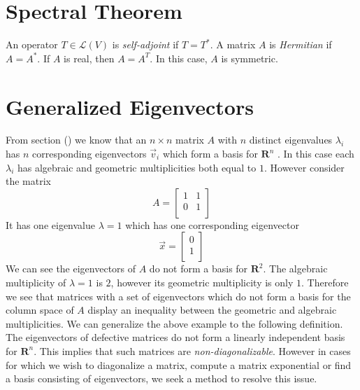 \section{Spectral Theorem}
{An operator $T \in \mathcal{L}(V)$ is \textit{self-adjoint} if $T = T^*$.}
{A matrix $A$ is \textit{Hermitian} if $A = A^*$. 
If $A$ is real, then $A = A^T$. 
In this case, $A$ is symmetric.}


\section{Generalized Eigenvectors}
From section () we know that an $n \times n$ matrix $A$ with $n$ distinct eigenvalues $\lambda_i$ has $n$ corresponding eigenvectors $\vec{v}_i$ which form a basis for $\mathbf{R}^n$ . In this case each $\lambda_i$ has algebraic and geometric multiplicities both equal to $1$. However consider the matrix 
\[A = \begin{bmatrix}
1 & 1 \\
0 & 1 \\
\end{bmatrix} \]
It has one eigenvalue $\lambda = 1$ which has one corresponding eigenvector
\[\vec{x} = \begin{bmatrix}
    0 \\
    1 \\
\end{bmatrix}\]
We can see the eigenvectors of $A$ do not form a basis for $\mathbf{R}^2$. The algebraic multiplicity of $\lambda = 1$ is $2$, however its geometric multiplicity is only $1$. Therefore we see that matrices with a set of eigenvectors which do not form a basis for the column space of $A$ display an inequality between the geometric and algebraic multiplicities. We can generalize the above example to the following definition. 
The eigenvectors of defective matrices do not form a linearly independent basis for $\mathbf{R}^n$. This implies that such matrices are \textit{non-diagonalizable}.
However in cases for which we wish to diagonalize a matrix, compute a matrix exponential or find a basis consisting of eigenvectors, we seek a method to resolve this issue. 





